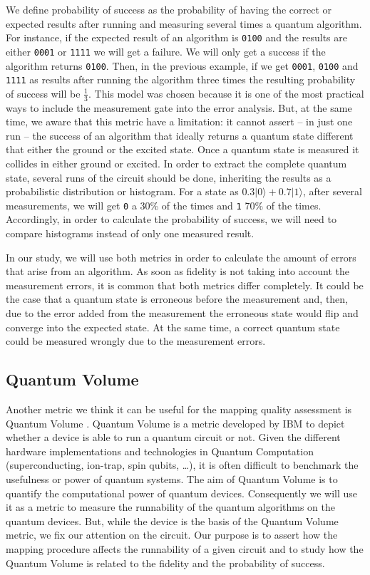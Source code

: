We define probability of success as the probability of having the correct or expected results after running and measuring several times a quantum algorithm.
For instance, if the expected result of an algorithm is \texttt{0100} and the results are either \texttt{0001} or \texttt{1111} we will get a failure.
We will only get a success if the algorithm returns \texttt{0100}.
Then, in the previous example, if we get \texttt{0001}, \texttt{0100} and \texttt{1111} as results after running the algorithm three times the resulting probability of success will be \(\frac{1}{3}\).
This model was chosen because it is one of the most practical ways to include the measurement gate into the error analysis.
But, at the same time, we aware that this metric have a limitation: it cannot assert -- in just one run -- the success of an algorithm that ideally returns a quantum state different that either the ground or the excited state.
Once a quantum state is measured it collides in either ground or excited.
In order to extract the complete quantum state, several runs of the circuit should be done, inheriting the results as a probabilistic distribution or histogram.
For a state as \(0.3 | 0 \rangle + 0.7 | 1 \rangle\), after several measurements, we will get \texttt{0} a 30\% of the times and \texttt{1} 70\% of the times.
Accordingly, in order to calculate the probability of success, we will need to compare histograms instead of only one measured result.



In our study, we will use both metrics in order to calculate the amount of errors that arise from an algorithm.
As soon as fidelity is not taking into account the measurement errors, it is common that both metrics differ completely.
It could be the case that a quantum state is erroneous before the measurement and, then, due to the error added from the measurement the erroneous state would flip and converge into the expected state.
At the same time, a correct quantum state could be measured wrongly due to the measurement errors.

\subsection{Quantum Volume}
\label{sec:org3029336}

Another metric we think it can be useful for the mapping quality assessment is Quantum Volume \cite{Bishop_2017,Moll_2018}.
Quantum Volume is a metric developed by IBM to depict whether a device is able to run a quantum circuit or not.
Given the different hardware implementations and technologies in Quantum Computation (superconducting, ion-trap, spin qubits, \ldots{}), it is often difficult to benchmark the usefulness or power of quantum systems. 
The aim of Quantum Volume is to quantify the computational power of quantum devices. 
Consequently we will use it as a metric to measure the runnability of the quantum algorithms on the quantum devices.
But, while the device is the basis of the Quantum Volume metric, we fix our attention on the circuit.
Our purpose is to assert how the mapping procedure affects the runnability of a given circuit and to study how the Quantum Volume is related to the fidelity and the probability of success.


